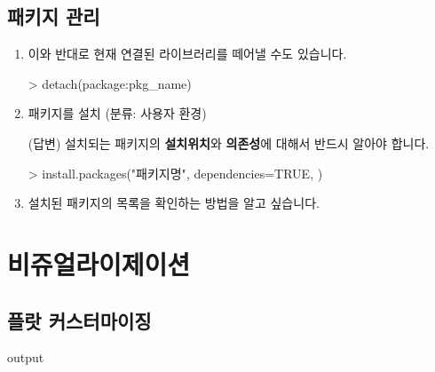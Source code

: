 \documentclass{report}
\begin{document}
%
%
%

\section{패키지 관리}
\begin{enumerate}
\item 	이와 반대로 현재 연결된 라이브러리를 떼어낼 수도 있습니다. 

	\begin{Schunk}
	\begin{Soutput}
	> detach(package:pkg_name)	
	\end{Soutput}
	\end{Schunk}


	\item 패키지를 설치 (분류: 사용자 환경)  
	
	\textsf{(답변)} 설치되는 패키지의 \textbf{설치위치}와 \textbf{의존성}에 대해서 반드시 알아야 합니다. 
	
	\begin{Schunk}
	\begin{Soutput}
	> install.packages("패키지명", dependencies=TRUE, )
	\end{Soutput}
	\end{Schunk}

	\item 설치된 패키지의 목록을 확인하는 방법을 알고 싶습니다.
\end{enumerate}


%
%

\chapter{비쥬얼라이제이션}

\section{플랏 커스터마이징}
\begin{Schunk}
\begin{Soutput}
output
\end{Soutput}
\end{Schunk}
\end{document}
